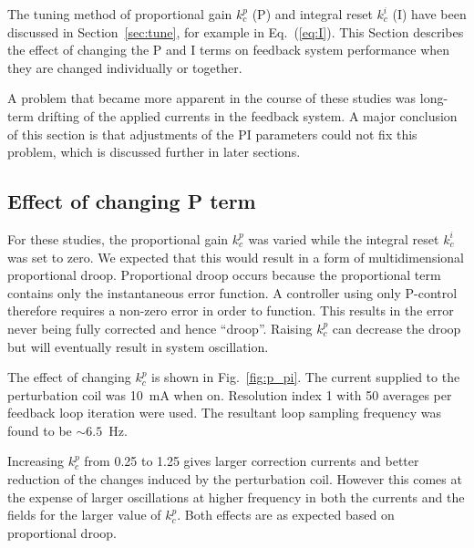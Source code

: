 The tuning method of proportional gain $k_c^p$ (P) and integral reset
$k_c^i$ (I) have been discussed in Section~\ref{sec:tune}, for example
in Eq.~(\ref{eq:I}).  This Section describes the effect of changing the P and I terms on feedback system performance when they are changed individually or together.

A problem that became more apparent in the course of these studies was
long-term drifting of the applied currents in the feedback system.  A
major conclusion of this section is that adjustments of the PI
parameters could not fix this problem, which is discussed further in
later sections.


\subsection{Effect of changing P term}

For these studies, the proportional gain $k_c^p$ was varied while the
integral reset $k_c^i$ was set to zero.  We expected that this would
result in a form of multidimensional proportional droop.  Proportional
droop occurs because the proportional term contains only the
instantaneous error function.  A controller using only P-control
therefore requires a non-zero error in order to function.  This
results in the error never being fully corrected and hence ``droop''.
Raising $k_c^p$ can decrease the droop but will eventually result in
system oscillation.



The effect of changing $k_c^p$ is shown in Fig.~\ref{fig:p_pi}.  The
current supplied to the perturbation coil was 10~mA when on.
Resolution index 1 with 50 averages per feedback loop iteration were
used.  The resultant loop sampling frequency was found to be $\sim
6.5$~Hz.

Increasing $k_c^p$ from 0.25 to 1.25 gives larger correction currents
and better reduction of the changes induced by the perturbation coil.
However this comes at the expense of larger oscillations at higher
frequency in both the currents and the fields for the larger value of
$k_c^p$.  Both effects are as expected based on proportional droop.

